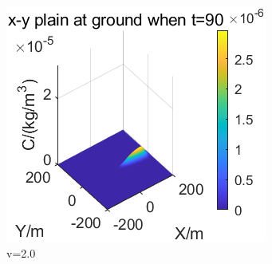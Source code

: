 \documentclass{article}
\begin{document}
\begin{figure}[htbp]
		\begin{minipage}{0.33\textwidth}
			\includegraphics[width=\textwidth]{pics/v=2,t=90.png}
		\end{minipage}
		\caption{v=2.0}
		\label{fig17}
	\end{figure}
\end{document}
